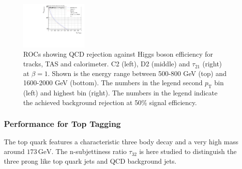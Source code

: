\begin{figure}[htp]
\includegraphics[width=0.3\textwidth]{sascha_input/plots/Higgs/ROC/Beta1/ROC_ALL_h_recoJet_nSub21_bin5.pdf}
\caption{{ROCs showing QCD rejection against Higgs boson efficiency for tracks, TAS and calorimeter. C2 (left), D2 (middle) and $\tau_{21}$ (right) at $\beta=1$. Shown is the energy range between 500-800 GeV (top) and 1600-2000 GeV (bottom). The numbers in the legend second $p_{\mathrm{T}}$ bin (left) and highest bin (right). The numbers in the legend indicate the achieved background rejection at 50\% signal efficiency.}}\label{fig:ROC_higgs_nSub21}
\end{figure}

\subsubsection{Performance for Top Tagging}
The top quark features a characteristic three body decay and a very high mass around $173 \, \text{GeV}$. The n-subjettiness ratio $\tau_{32}$ is here studied to distinguish the three prong like top quark jets and QCD background jets.

